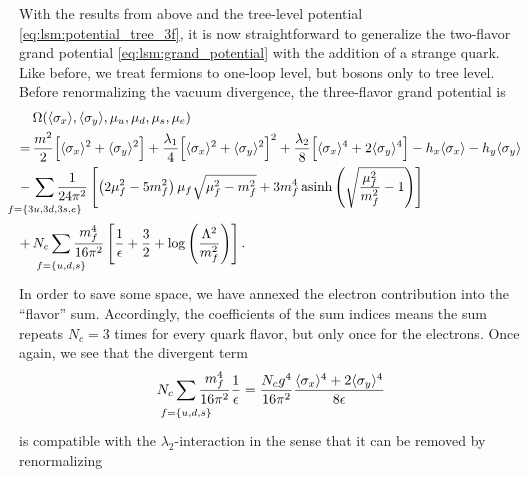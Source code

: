 With the results from above and the tree-level potential \eqref{eq:lsm:potential_tree_3f}, it is now straightforward to generalize the two-flavor grand potential \eqref{eq:lsm:grand_potential} with the addition of a strange quark.
Like before, we treat fermions to one-loop level, but bosons only to tree level.
Before renormalizing the vacuum divergence, the three-flavor grand potential is
\begin{equation}
\begin{split}
	 & \, \Omega(\avg{\sigma_x},\avg{\sigma_y},\mu_u,\mu_d,\mu_s,\mu_e) \\
	=& \, \frac{m^2}{2} \Big[\avg{\sigma_x}^2 + \avg{\sigma_y}^2\Big] + \frac{\lambda_1}{4} \Big[\avg{\sigma_x}^2 + \avg{\sigma_y}^2\Big]^2 + \frac{\lambda_2 }{8} \Big[\avg{\sigma_x}^4 + 2 \avg{\sigma_y}^4\Big] - h_x \avg{\sigma_x} - h_y \avg{\sigma_y} \\
	-& \, \smashoperator{\sum_{\vphantom{\big|} f=\{3u,3d,3s,e\}}} \frac{1}{24 \pi^2} \left[ \left( 2 \mu_f^2 - 5 m_f^2 \right) \mu_f \sqrt{\mu_f^2 - m_f^2} + 3 m_f^4 \asinh \left( \sqrt{\frac{\mu_{\smash{f}}^2}{m_f^2}-1} \right) \right] \\
	+& \, N_c \smashoperator{\sum_{\vphantom{\big|}f=\{u,d,s\}}} \frac{m_f^4}{16 \pi^2} \left[ \frac{1}{\epsilon} + \frac{3}{2} + \log\left(\frac{{\Lambda}^2}{m_f^2}\right) \right].
\end{split}
\end{equation}
In order to save some space, we have annexed the electron contribution into the ``flavor'' sum.
Accordingly, the coefficients of the sum indices means the sum repeats $N_c = 3$ times for every quark flavor, but only once for the electrons.
Once again, we see that the divergent term
\begin{equation}
	N_c \smashoperator{\sum_{\vphantom{\big|}f=\{u,d,s\}}} \frac{m_f^4}{16 \pi^2} \frac{1}{\epsilon} =
	\frac{N_c g^4}{16 \pi^2} \frac{\avg{\sigma_x}^4 + 2 \avg{\sigma_y}^4}{8 \epsilon}
\end{equation}
is compatible with the $\lambda_2$-interaction in the sense that it can be removed by renormalizing
